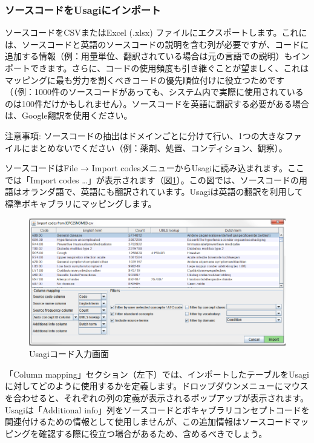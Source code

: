 \documentclass[
  11pt]{book}
\theoremstyle{definition}
\theoremstyle{definition}
\theoremstyle{definition}
\theoremstyle{definition}
\theoremstyle{remark}
\begin{document}
\subsubsection*{ソースコードをUsagiにインポート}\label{ux30bdux30fcux30b9ux30b3ux30fcux30c9ux3092usagiux306bux30a4ux30f3ux30ddux30fcux30c8}

ソースコードをCSVまたはExcel (.xlsx) ファイルにエクスポートします。これには、ソースコードと英語のソースコードの説明を含む列が必要ですが、コードに追加する情報（例：用量単位、翻訳されている場合は元の言語での説明）もインポートできます。さらに、コードの使用頻度も引き継ぐことが望ましく、これはマッピングに最も労力を割くべきコードの優先順位付けに役立つためです（（例：1000件のソースコードがあっても、システム内で実際に使用されているのは100件だけかもしれません）。ソースコードを英語に翻訳する必要がある場合は、Google翻訳を使用ください。

注意事項: ソースコードの抽出はドメインごとに分けて行い、1つの大きなファイルにまとめないでください（例：薬剤、処置、コンディション、観察）。

ソースコードはFile → Import codesメニューからUsagiに読み込まれます。ここでは「Import codes \ldots」が表示されます（図\ref{fig:usagiImport}）。この図では、ソースコードの用語はオランダ語で、英語にも翻訳されています。Usagiは英語の翻訳を利用して標準ボキャブラリにマッピングします。

\begin{figure}

{\centering \includegraphics[width=1\linewidth]{images/ExtractTransformLoad/usagiImport} 

}

\caption{Usagiコード入力画面}\label{fig:usagiImport}
\end{figure}

「Column mapping」セクション（左下）では、インポートしたテーブルをUsagiに対してどのように使用するかを定義します。ドロップダウンメニューにマウスを合わせると、それぞれの列の定義が表示されるポップアップが表示されます。Usagiは「Additional info」列をソースコードとボキャブラリコンセプトコードを関連付けるための情報として使用しませんが、この追加情報はソースコードマッピングを確認する際に役立つ場合があるため、含めるべきでしょう。
\end{document}
